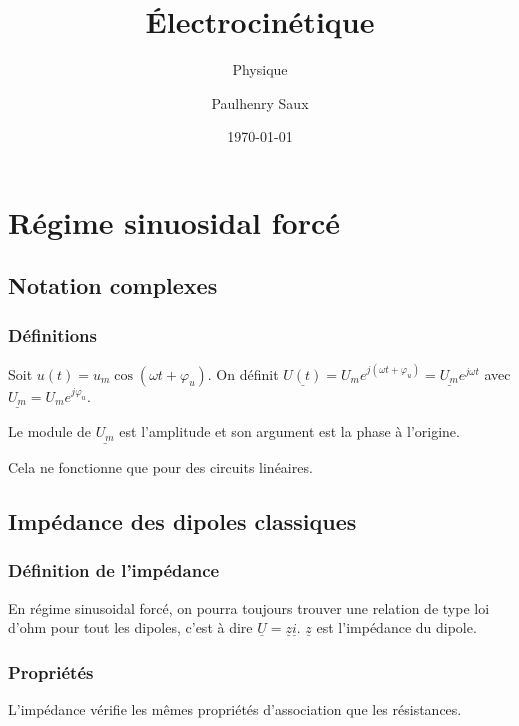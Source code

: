 \documentclass[french]{yLectureNote}
\title{Électrocinétique}
\subtitle{Physique}
\author{Paulhenry Saux}
\date{\today}
\begin{document}
\setcounter{chapter}{5}

\chapter{Régime sinuosidal forcé}
%
\section{Notation complexes}
\subsection{Définitions}
Soit \(u(t) = u_m \cos(\omega t+\varphi_u)\). On définit \(\underline{U(t)} = U_m e^{j(\omega t+\varphi_u)} = \underline{U_m} e^{j\omega t}\) avec \(\underline{U_m} = U_m e^{j \varphi_u}\).

Le module de \(\underline{U_m}\) est l'amplitude et son argument est la phase à l'origine.

Cela ne fonctionne que pour des circuits linéaires.



\section{Impédance des dipoles classiques}
\subsection{Définition de l'impédance}
En régime sinusoidal forcé, on pourra toujours trouver une relation de type loi d'ohm pour tout les dipoles, c'est à dire \(\underline{U} = \underline{z}\underline{i}\). \(\underline{z}\) est l'impédance du dipole.
\subsection{Propriétés}
L'impédance vérifie les m\^emes propriétés d'association que les résistances.
\end{document}
